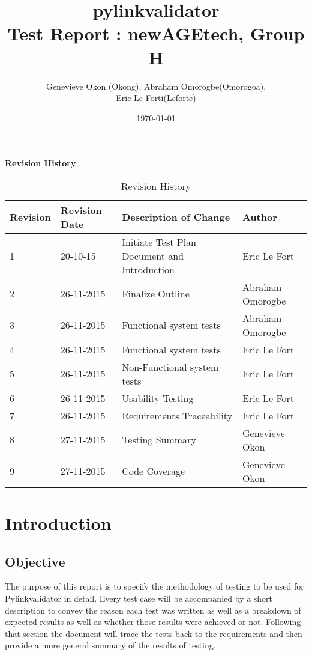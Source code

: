\documentclass[12pt, titlepage]{article}
\begin{document}
\title{pylinkvalidator \\
 Test Report : newAGEtech, Group H }
\author{Genevieve Okon (Okong), Abraham Omorogbe(Omorogoa),\\
 Eric Le Forti(Leforte)}
\date{\today}
\maketitle

\tableofcontents
\listoftables
\listoffigures
\pagebreak

\begin{center}\textbf{Revision History}\end{center}
\begin{table}[h!]
\centering
	\begin{tabular}{| p{1.5cm} | p{2.5cm} | p{7cm} |p{3cm} |}    \hline
	Revision  &Revision Date &Description of Change &Author\\ \hline
	1& 20-10-15 &Initiate Test Plan Document  and Introduction&Eric Le Fort\\ \hline
	2&26-11-2015&Finalize Outline & Abraham Omorogbe\\ \hline	
3&26-11-2015&Functional system tests& Abraham Omorogbe\\ \hline
4&26-11-2015&Functional system tests& Eric Le Fort\\ \hline
5&26-11-2015&Non-Functional system tests& Eric Le Fort\\ \hline
6 &26-11-2015&Usability Testing & Eric Le Fort\\ \hline
7& 26-11-2015& Requirements Traceability & Eric Le Fort\\ \hline
8& 27-11-2015 &Testing Summary& Genevieve Okon\\ \hline
9& 27-11-2015 &Code Coverage& Genevieve Okon\\ \hline

	
       \end{tabular}
       \caption{Revision History}
       \label{table:Revision History}
\end{table}





\section{Introduction}
\subsection{Objective}
The purpose of this report is to specify the methodology of testing to be used for Pylinkvalidator in detail. Every test case will be accompanied by a short description to convey the reason each test was written as well as a breakdown of expected results as well as whether those results were achieved or not. Following that section the document will trace the tests back to the requirements and then provide a more general summary of the results of testing.
\end{document}
